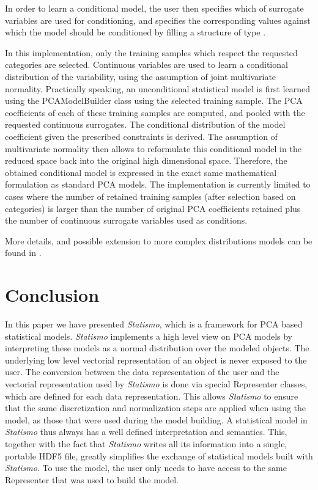 \documentclass{InsightArticle}
\newcommand{\Statismo}{\emph{Statismo}\xspace}
\begin{document}
In order to learn a conditional model, the user then specifies which
of surrogate variables are used for conditioning, and specifies the
corresponding values against which the model should be conditioned by
filling a structure of type .

In this implementation, only the training samples which respect the
requested categories are selected.  Continuous variables are used to
learn a conditional distribution of the variability, using the 
assumption of joint multivariate normality. Practically speaking, an
unconditional statistical model is first learned using the
PCAModelBuilder class using the selected training sample. The PCA
coefficients of each of these training samples are computed, and
pooled with the requested continuous surrogates. The
conditional distribution of the model coefficient given the prescribed
constraints is derived. The assumption of multivariate normality then
allows to reformulate this conditional model in the reduced space back
into the original high dimensional space. Therefore, the obtained
conditional model is expressed in the exact same mathematical
formulation as standard PCA models.  The implementation is currently
limited to cases where the number of retained training samples (after
selection based on categories) is larger than the number of original
PCA coefficients retained plus the number of continuous surrogate
variables used as conditions.

More details, and possible extension to more complex distributions
models can be found in \cite{blanc_conditional_2009}.

\section{Conclusion}
In this paper we have presented \Statismo, which is a framework for
PCA based statistical models.  \Statismo implements a high level view
on PCA models by interpreting these models as a normal distribution over
the modeled objects. The underlying low level vectorial representation
of an object is never exposed to the user.  The conversion between
the data representation of the user and the vectorial representation
used by \Statismo is done via special Representer classes, which are
defined for each data representation. This allows \Statismo to ensure
that the same discretization and normalization steps are applied when
using the model, as those that were used during the model building.  A
statistical model in \Statismo thus always has a well defined
interpretation and semantics.  This, together with the fact that
\Statismo writes all its information into a single, portable HDF5
file, greatly simplifies the exchange of statistical models built with \Statismo.
To use the model, the user only needs to have access to the same Representer that was used to build the model. 
\end{document}
